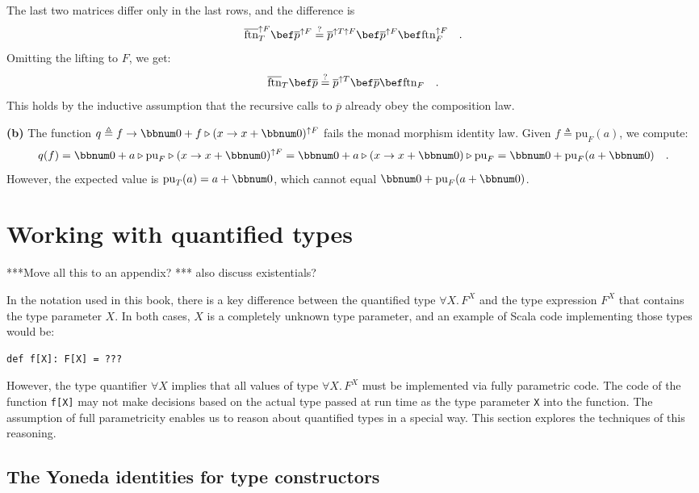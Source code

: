 The last two matrices differ only in the last rows, and the difference
is
\[
\overline{\text{ftn}}_{T}^{\uparrow F}\bef\overline{p}^{\uparrow F}\overset{?}{=}\overline{p}^{\uparrow T\uparrow F}\bef\overline{p}^{\uparrow F}\bef\text{ftn}_{F}^{\uparrow F}\quad.
\]
Omitting the lifting to $F$, we get:
\[
\overline{\text{ftn}}_{T}\bef\overline{p}\overset{?}{=}\overline{p}^{\uparrow T}\bef\overline{p}\bef\text{ftn}_{F}\quad.
\]
This holds by the inductive assumption that the recursive calls to
$\overline{p}$ already obey the composition law.

\textbf{(b)} The function $q\triangleq f\rightarrow\bbnum 0+f\triangleright(x\rightarrow x+\bbnum 0)^{\uparrow F}$
fails the monad morphism identity law. Given $f\triangleq\text{pu}_{F}(a)$,
we compute: 
\[
q(f)=\bbnum 0+a\triangleright\text{pu}_{F}\triangleright(x\rightarrow x+\bbnum 0)^{\uparrow F}=\bbnum 0+a\triangleright(x\rightarrow x+\bbnum 0)\triangleright\text{pu}_{F}=\bbnum 0+\text{pu}_{F}(a+\bbnum 0)\quad.
\]
However, the expected value is $\text{pu}_{T}(a)=a+\bbnum 0$, which
cannot equal  $\bbnum 0+\text{pu}_{F}(a+\bbnum 0)$.

\section{Working with quantified types}

{*}{*}{*}Move all this to an appendix? {*}{*}{*} also discuss existentials?

In the notation used in this book, there is a key difference between
the quantified type $\forall X.\,F^{X}$ and the type expression $F^{X}$
that contains the type parameter $X$. In both cases, $X$ is a completely
unknown type parameter, and an example of Scala code implementing
those types would be:
\begin{lstlisting}
def f[X]: F[X] = ???
\end{lstlisting}
However, the type quantifier $\forall X$ implies that all values
of type $\forall X.\,F^{X}$ must be implemented via fully parametric
code. The code of the function \lstinline!f[X]!
may not make decisions based on the actual type passed at run time
as the type parameter \lstinline!X!
into the function. The assumption of full parametricity enables us
to reason about quantified types in a special way. This section explores
the techniques of this reasoning.

\subsection{The Yoneda identities for type constructors}

